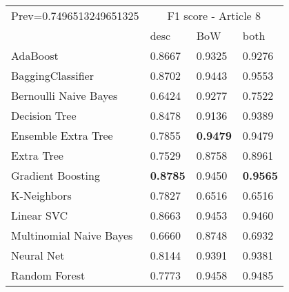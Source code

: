 \begin{tabular}{|l|l|l|l| }
\hline
Prev=0.7496513249651325 &  \multicolumn{3}{c|}{F1 score - Article 8} \\
\cline{2-4} & desc & BoW & both \\ \hline
AdaBoost                & 0.8667 & 0.9325 & 0.9276\\
BaggingClassifier       & 0.8702 & 0.9443 & 0.9553\\
Bernoulli Naive Bayes   & 0.6424 & 0.9277 & 0.7522\\
Decision Tree           & 0.8478 & 0.9136 & 0.9389\\
Ensemble Extra Tree     & 0.7855 & {\bf 0.9479} & 0.9479\\
Extra Tree              & 0.7529 & 0.8758 & 0.8961\\
Gradient Boosting       & {\bf 0.8785} & 0.9450 & {\bf 0.9565}\\
K-Neighbors             & 0.7827 & 0.6516 & 0.6516\\
Linear SVC              & 0.8663 & 0.9453 & 0.9460\\
Multinomial Naive Bayes & 0.6660 & 0.8748 & 0.6932\\
Neural Net              & 0.8144 & 0.9391 & 0.9381\\
Random Forest           & 0.7773 & 0.9458 & 0.9485\\
\hline
\end{tabular}